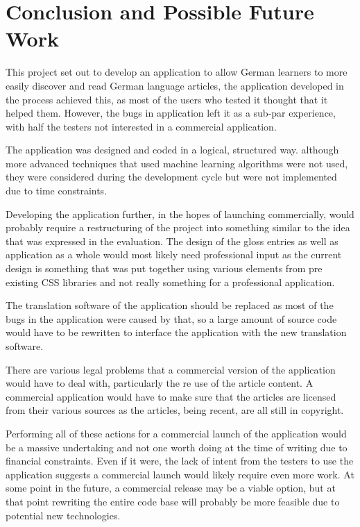 \chapter{Conclusion and Possible Future Work}

This project set out to develop an application to allow German learners to more easily discover and read German language articles, the application developed in the process achieved this, as most of the users who tested it thought that it helped them. However, the bugs in application left it as a sub-par experience, with half the testers not interested in a commercial application. 

The application was designed and coded in a logical, structured way. although more advanced techniques that used machine learning algorithms were not used, they were considered during the development cycle but were not implemented due to time constraints.

Developing the application further, in the hopes of launching commercially, would probably require a restructuring  of the project into something similar to the idea that was expressed in the evaluation. The design of the gloss entries as well as application as a whole would most likely need professional input as the current design is something that was put together using various elements from pre existing CSS libraries and not really something for a professional application.

The translation software of the application should be replaced as most of the bugs in the application were caused by that, so a large amount of source code would have to be rewritten to interface the application with the new translation software.

There are various legal problems that a commercial version of the application would have to deal with, particularly the re use of the article content. A commercial application would have to make sure that the articles are licensed from their various sources as the articles, being recent, are all still in copyright.

Performing all of these actions for a commercial launch of the application would be a massive undertaking and not one worth doing at the time of writing due to financial constraints. Even if it were, the lack of intent from the testers to use the application suggests a commercial launch would likely require even more work. At some point in the future, a commercial release may be a viable option, but at that point rewriting the entire code base will probably be more feasible due to potential new technologies. 